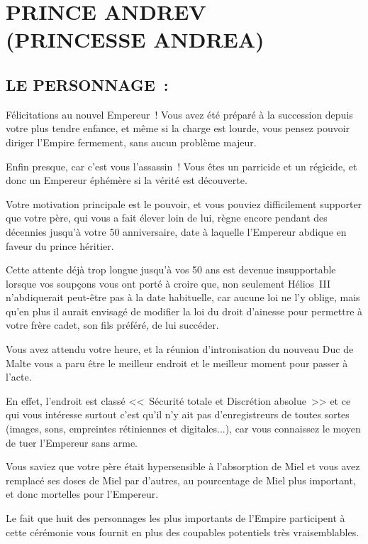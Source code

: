 \documentclass[14pt,twocolumn]{extarticle}
\begin{document}
\section{PRINCE ANDREV\\(PRINCESSE ANDREA)}

\subsection{LE PERSONNAGE~:}

Félicitations au nouvel Empereur~! Vous avez été préparé à la succession depuis
votre plus tendre enfance, et même si la charge est lourde, vous pensez pouvoir
diriger l'Empire fermement, sans aucun problème majeur.

Enfin presque, car c'est vous l'assassin~! Vous êtes un parricide et un
régicide, et donc un Empereur éphémère si la vérité est découverte.

Votre motivation principale est le pouvoir, et vous pouviez difficilement
supporter que votre père, qui vous a fait élever loin de lui, règne encore
pendant des décennies jusqu'à votre 50\ieme{} anniversaire, date à laquelle
l'Empereur abdique en faveur du prince héritier.

Cette attente déjà trop longue jusqu'à vos 50 ans est devenue insupportable
lorsque vos soupçons vous ont porté à croire que, non seulement Hélios~III
n'abdiquerait peut-être pas à la date habituelle, car aucune loi ne l'y oblige,
mais qu'en plus il aurait envisagé de modifier la loi du droit d'ainesse pour
permettre à votre frère cadet, son fils préféré, de lui succéder.

Vous avez attendu votre heure, et la réunion d'intronisation du nouveau Duc de
Malte vous a paru être le meilleur endroit et le meilleur moment pour passer à
l'acte.

En effet, l'endroit est classé <<~Sécurité totale et Discrétion absolue~>> et
ce qui vous intéresse surtout c'est qu'il n'y ait pas d'enregistreurs de toutes
sortes (images, sons, empreintes rétiniennes et digitales...), car vous
connaissez le moyen de tuer l'Empereur sans arme.

Vous saviez que votre père était hypersensible à l'absorption de Miel et vous
avez remplacé ses doses de Miel par d'autres, au pourcentage de Miel plus
important, et donc mortelles pour l'Empereur.

Le fait que huit des personnages les plus importants de l'Empire participent à
cette cérémonie vous fournit en plus des coupables potentiels très
vraisemblables.
\end{document}
